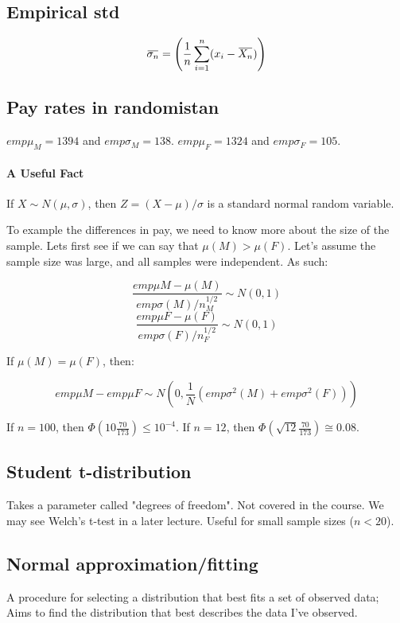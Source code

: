 \documentclass[a4paper]{article}
\newcommand{\mean}[1]{\mkern 1.5mu\overline{\mkern-1.5mu#1\mkern-1.5mu}\mkern 1.5mu}
\begin{document}
\subsection{Empirical std}

\[
\mean{\sigma_n}=\left( \frac{1}{n}\sum_{i=1}^{n}(x_i-\mean{X_n}) \right)
\]

\subsection{Pay rates in randomistan}

$emp\mu_M=1394$ and $emp\sigma_M=138$.
$emp\mu_F=1324$ and $emp\sigma_F=105$.

\paragraph{A Useful Fact}
If $X \sim N(\mu, \sigma)$, then $Z=(X-\mu)/\sigma$ is a standard normal random variable.

To example the differences in pay, we need to know more about the size of the sample. Lets first see if we can say that $\mu(M)>\mu(F)$. Let's assume the sample size was large, and all samples were independent. As such:

\[\frac{emp\mu M-\mu(M)}{emp\sigma(M)/n_M^{1/2}} \sim N(0,1)\]
\[\frac{emp\mu F-\mu(F)}{emp\sigma(F)/n_F^{1/2}} \sim N(0,1)\]

If $\mu(M)=\mu(F)$, then:

\[emp\mu M-emp\mu F \sim N(0, \frac{1}{N}(emp\sigma^2(M)+emp\sigma^2(F)))\]

If $n=100$, then $\Phi(10 \frac{70}{173})\le 10^{-4}$. If $n=12$, then $\Phi(\sqrt{12}\frac{70}{173}) \cong 0.08$.

\subsection{Student t-distribution}

Takes a parameter called "degrees of freedom". Not covered in the course. We may see Welch's t-test in a later lecture. Useful for small sample sizes ($n < 20$).

\subsection{Normal approximation/fitting}

A procedure for selecting a distribution that best fits a set of observed data; Aims to find the distribution that best describes the data I've observed.
\end{document}
